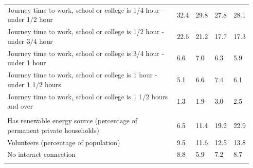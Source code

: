 \documentclass{article}
\begin{document}
\begin{table}[h]
\begin{tabular}{KTTTT}
Journey time to work, school or college is 1/4 hour - under 1/2 hour & 32.4& 29.8& 27.8& 28.1\\
Journey time to work, school or college is 1/2 hour - under 3/4 hour & 22.6& 21.2& 17.7& 17.3\\
Journey time to work, school or college is 3/4 hour - under 1 hour & 6.6& 7.0& 6.3& 5.9\\
Journey time to work, school or college is 1 hour - under 1 1/2 hours & 5.1& 6.6& 7.4& 6.1\\
Journey time to work, school or college is 1 1/2 hours and over & 1.3& 1.9& 3.0& 2.5\\
\hline
    \\ 
    \hline
Has renewable energy source (percentage of permanent private households) &  6.5& 11.4& 19.2& 22.9\\
    \hline
Volunteers (percentage of population) &  9.5& 11.6& 12.5& 13.8\\
    \hline
No internet connection& 8.8& 5.9& 7.2& 8.7\\
\hline
\end{tabular}
\end{table}
\end{document}

